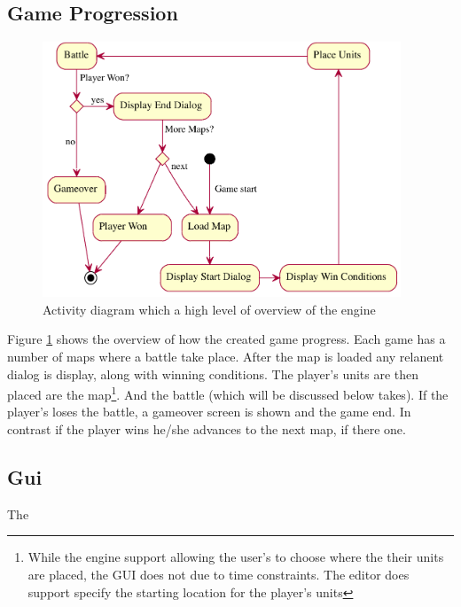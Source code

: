 \subsection{Game Progression}
\begin{figure}[htbp]
	\centering
		\includegraphics[height=3in]{figures/game.pdf}
	\caption{Activity diagram which a high level of overview of the engine}
	\label{fig:figures_game}
\end{figure}

Figure \ref{fig:figures_game} shows the overview of how the created game progress.  Each game has a number of maps where a battle take place. After the map is loaded any relanent dialog is display, along with winning conditions. The player's units are then placed are the map\footnote{While the engine support allowing the user's to choose where the their units are placed, the GUI does not due to time constraints. The editor does support specify the starting location for the player's units}.  And the battle (which will be discussed below takes). If the player's loses the battle, a gameover screen is shown and the game end. In contrast if the player wins he/she advances to the next map, if there one.    

\subsection{Gui}

The 

